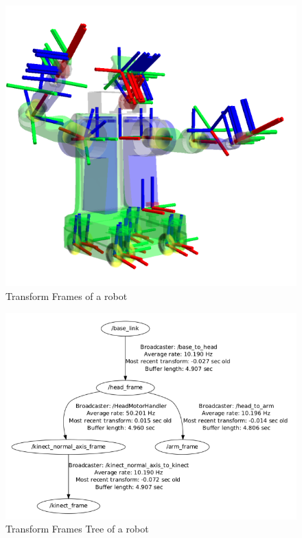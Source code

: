 \begin{figure}[H]
    \centering
    \includegraphics[scale = 0.5]{Images/Chapter 2/robottf.png}
    \caption{Transform Frames of a robot}
    \label{fig:robottf}
\end{figure}

\begin{figure}[H]
    \centering
    \includegraphics[scale = 0.5]{Images/Chapter 2/robottftree.png}
    \caption{Transform Frames Tree of a robot}
    \label{fig:robottf}
\end{figure}
\newpage
